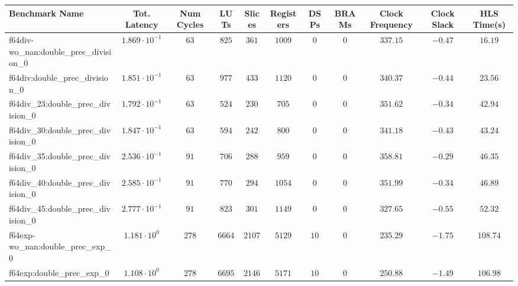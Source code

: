 \begin{tabular}{|l|c|c|c|c|c|c|c|c|c|c|}
\hline
Benchmark Name                                 & Tot. Latency            & Num Cycles & LUTs       & Slices    & Registers  & DSPs    & BRAMs & Clock Frequency & Clock Slack & HLS Time(s) \\
\hline
f64div-wo\_nan:double\_prec\_division\_0       & $ 1.869 \cdot 10^{-1} $ & $ 63     $ & $ 825    $ & $ 361   $ & $ 1009   $ & $ 0   $ & $ 0 $ & $ 337.15      $ & $ -0.47   $ & $ 16.19   $ \\
f64div:double\_prec\_division\_0               & $ 1.851 \cdot 10^{-1} $ & $ 63     $ & $ 977    $ & $ 433   $ & $ 1120   $ & $ 0   $ & $ 0 $ & $ 340.37      $ & $ -0.44   $ & $ 23.56   $ \\
f64div\_23:double\_prec\_division\_0           & $ 1.792 \cdot 10^{-1} $ & $ 63     $ & $ 524    $ & $ 230   $ & $ 705    $ & $ 0   $ & $ 0 $ & $ 351.62      $ & $ -0.34   $ & $ 42.94   $ \\
f64div\_30:double\_prec\_division\_0           & $ 1.847 \cdot 10^{-1} $ & $ 63     $ & $ 594    $ & $ 242   $ & $ 800    $ & $ 0   $ & $ 0 $ & $ 341.18      $ & $ -0.43   $ & $ 43.24   $ \\
f64div\_35:double\_prec\_division\_0           & $ 2.536 \cdot 10^{-1} $ & $ 91     $ & $ 706    $ & $ 288   $ & $ 959    $ & $ 0   $ & $ 0 $ & $ 358.81      $ & $ -0.29   $ & $ 46.35   $ \\
f64div\_40:double\_prec\_division\_0           & $ 2.585 \cdot 10^{-1} $ & $ 91     $ & $ 770    $ & $ 294   $ & $ 1054   $ & $ 0   $ & $ 0 $ & $ 351.99      $ & $ -0.34   $ & $ 46.89   $ \\
f64div\_45:double\_prec\_division\_0           & $ 2.777 \cdot 10^{-1} $ & $ 91     $ & $ 823    $ & $ 301   $ & $ 1149   $ & $ 0   $ & $ 0 $ & $ 327.65      $ & $ -0.55   $ & $ 52.32   $ \\
f64exp-wo\_nan:double\_prec\_exp\_0            & $ 1.181 \cdot 10^{0}  $ & $ 278    $ & $ 6664   $ & $ 2107  $ & $ 5129   $ & $ 10  $ & $ 0 $ & $ 235.29      $ & $ -1.75   $ & $ 108.74  $ \\
f64exp:double\_prec\_exp\_0                    & $ 1.108 \cdot 10^{0}  $ & $ 278    $ & $ 6695   $ & $ 2146  $ & $ 5171   $ & $ 10  $ & $ 0 $ & $ 250.88      $ & $ -1.49   $ & $ 106.98  $ \\

\end{tabular}
